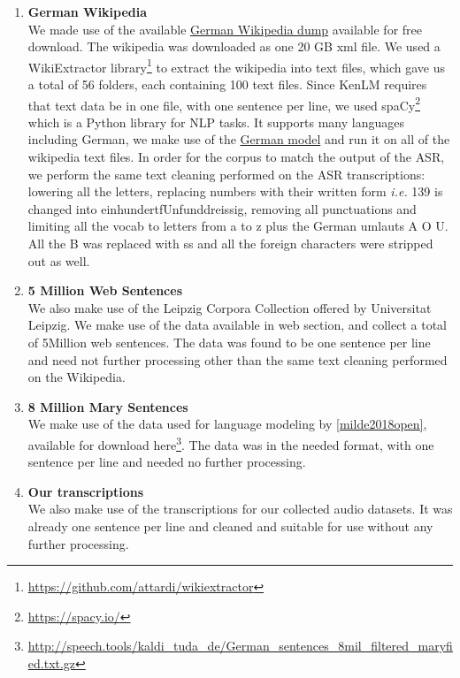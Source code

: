\begin{enumerate}
	\item \textbf{German Wikipedia} \\
	We made use of the available \href{https://dumps.wikimedia.org/dewiki/latest/}{German Wikipedia dump} available for free download. The wikipedia was downloaded as one 20 GB xml file. We used a WikiExtractor library\footnote{\url{https://github.com/attardi/wikiextractor}} to extract the wikipedia into text files, which gave us a total of 56 folders, each containing 100 text files. Since KenLM requires that text data be in one file, with one sentence per line, we used spaCy\footnote{\url{https://spacy.io/}} which is a Python library for \ac{NLP} tasks. It supports many languages including German, we make use of the \href{https://spacy.io/models/de}{German model} and run it on all of the wikipedia text files. In order for the corpus to match the output of the \ac{ASR}, we perform the same text cleaning performed on the \ac{ASR} transcriptions: lowering all the letters, replacing numbers with their written form \textit{i.e.} 139 is changed into einhundertfUnfunddreissig, removing all punctuations and limiting all the vocab to letters from a to z plus the German umlauts A O U. All the B was replaced with ss and all the foreign characters were stripped out as well.
	
	
	
	\item \textbf{5 Million Web Sentences} \\
	We also make use of the Leipzig Corpora Collection offered by Universitat Leipzig. We make use of the data available in web section, and collect a total of 5Million web sentences. The data was found to be one sentence per line and need not further processing other than the same text cleaning performed on the Wikipedia.
	
	
	\item \textbf{8 Million Mary Sentences} \\
	We make use of the data used for language modeling by \ref{milde2018open}, available for download here\footnote{\url{ http://speech.tools/kaldi_tuda_de/German_sentences_8mil_filtered_maryfied.txt.gz}}. The data was in the needed format, with one sentence per line and needed no further processing.
	
	
	\item \textbf{Our transcriptions} \\
	We also make use of the transcriptions for our collected audio datasets. It was already one sentence per line and cleaned and suitable for use without any further processing.

	
\end{enumerate}

